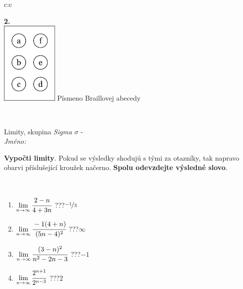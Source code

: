 \documentclass[10pt]{report}
\begin{document}
\begin{tabular}{c:c}
\begin{minipage}[c][104.5mm][t]{0.5\linewidth}
\begin{center}
\begin{minipage}{0.20\linewidth}
\begin{center}
{\Huge\bfseries 2.} \\[2mm]
\includegraphics[height=40mm]{../images/braille.png}
{\small Písmeno Braillovej abecedy}
\end{center}
\end{minipage}
\end{center}
\end{minipage}
\\ \hdashline
\begin{minipage}[c][104.5mm][t]{0.5\linewidth}
\begin{center}
\vspace{7mm}
{\huge Limity, skupina \textit{Sigma $\sigma$} -}\\[5mm]
\textit{Jméno:}\phantom{xxxxxxxxxxxxxxxxxxxxxxxxxxxxxxxxxxxxxxxxxxxxxxxxxxxxxxxxxxxxxxxxx}\\[5mm]
\begin{minipage}{0.95\linewidth}
\begin{center}
\textbf{Vypočti limity}. Pokud se výsledky shodujú s tými za otazníky, tak napravo\\obarvi příslušející kroužek načerno. \textbf{Spolu odevzdejte výsledné slovo}.
\end{center}
\end{minipage}
\\[1mm]
\begin{minipage}{0.79\linewidth}
\begin{center}
\begin{varwidth}{\linewidth}
\begin{enumerate}
\normalsize
\item $\lim\limits_{n\to\infty}\cfrac{2-n}{4+3n}$\quad \dotfill\; ???\;\dotfill \quad $\nicefrac{-1}{3}$
\item $\lim\limits_{n\to\infty}\cfrac{-1(4+n)}{(5n-4)^2}$\quad \dotfill\; ???\;\dotfill \quad $\infty$
\item $\lim\limits_{n\to\infty}\cfrac{(3-n)^2}{n^2-2n-3}$\quad \dotfill\; ???\;\dotfill \quad $-1$
\item $\lim\limits_{n\to\infty}\cfrac{2^{n+1}}{2^{n-3}}$\quad \dotfill\; ???\;\dotfill \quad $2$

\end{enumerate}
\end{varwidth}
\end{center}
\end{minipage}
\end{center}
\end{minipage}
\end{tabular}
\end{document}
